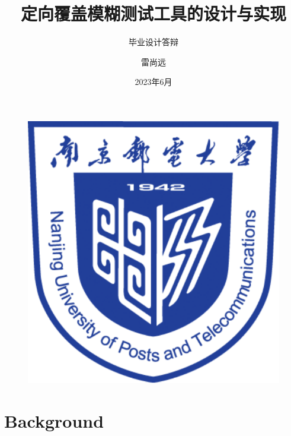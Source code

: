 \documentclass[10pt,aspectratio=43]{beamer}
\author{雷尚远}
\title{定向覆盖模糊测试工具的设计与实现}
\subtitle{毕业设计答辩}
\institute{南京邮电大学计算机学院}
\date{2023年6月}
\begin{document}
\begin{frame}
    \titlepage
    \begin{figure}[htpb]
        \begin{center}
            \includegraphics[width=0.2\linewidth]{pic/NJUPT_Logo.pdf}
        \end{center}
    \end{figure}
\end{frame}

\begin{frame}
    \tableofcontents[sectionstyle=show,subsectionstyle=show/shaded/hide,subsubsectionstyle=show/shaded/hide]
\end{frame}


\section{Background}
\end{document}

